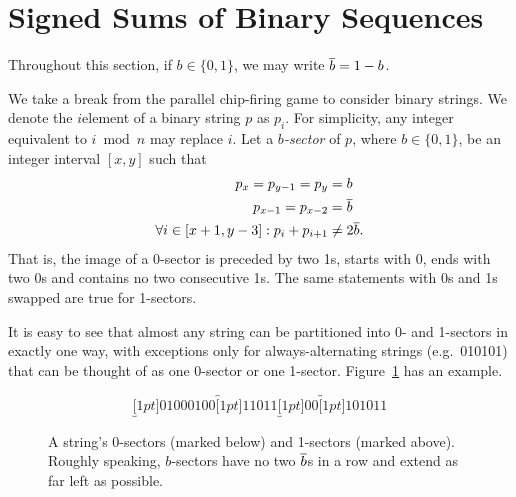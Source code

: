\section{Signed Sums of Binary Sequences}\label{binSeq}
Throughout this section, if $b \in \{0,1\}$, we may write $\overline{b} = 1-b$.

We take a break from the parallel chip-firing game to consider binary
strings. We denote the $i$\xth element of a binary string $p$ as $p_i$. For
simplicity, any integer equivalent to $i \bmod n$ may replace $i$. Let a
\emph{$b$-sector} of $p$, where $b \in \{0,1\}$, be an integer interval $[x,y]$
such that
\begin{align*}
  p_x = p_{y-1} = p_y &= b \\
  p_{x-1} = p_{x-2} &= \overline{b} \\
  \forall i \in [x+1, y-3]: p_i + p_{i+1} &\neq 2\overline{b}.
\end{align*}
That is, the image of a 0-sector is preceded by two 1s, starts with 0, ends
with two 0s and contains no two consecutive 1s. The same statements with 0s and
1s swapped are true for 1-sectors.

It is easy to see that almost any string can be partitioned into 0- and
1-sectors in exactly one way, with exceptions only for always-alternating
strings (e.g.\ 010101) that can be thought of as one 0-sector or one
1-sector. Figure~\ref{sectorEx} has an example.

\begin{figure}
  \[
    \underbracket[1pt]{01000100}\overbracket[1pt]{11011}\underbracket[1pt]{00}
    \overbracket[1pt]{101011}
  \]
  \caption{A string's 0-sectors (marked below) and 1-sectors (marked
    above). Roughly speaking, $b$-sectors have no two $\overline{b}$s in a row and
    extend as far left as possible.}
  \label{sectorEx}
\end{figure}

